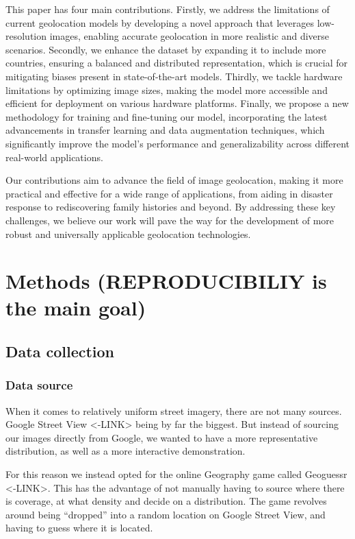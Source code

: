 \documentclass{article}
\begin{document}
This paper has four main contributions. Firstly, we address the
limitations of current geolocation models by developing a novel approach
that leverages low-resolution images, enabling accurate geolocation in
more realistic and diverse scenarios. Secondly, we enhance the dataset
by expanding it to include more countries, ensuring a balanced and
distributed representation, which is crucial for mitigating biases
present in state-of-the-art models. Thirdly, we tackle hardware
limitations by optimizing image sizes, making the model more accessible
and efficient for deployment on various hardware platforms. Finally, we
propose a new methodology for training and fine-tuning our model,
incorporating the latest advancements in transfer learning and data
augmentation techniques, which significantly improve the model's
performance and generalizability across different real-world
applications.

Our contributions aim to advance the field of image geolocation, making
it more practical and effective for a wide range of applications, from
aiding in disaster response to rediscovering family histories and
beyond. By addressing these key challenges, we believe our work will
pave the way for the development of more robust and universally
applicable geolocation technologies.

\section{Methods (REPRODUCIBILIY is the main
goal)}\label{methods-reproducibiliy-is-the-main-goal}

\subsection{Data collection}\label{data-collection}

\subsubsection{Data source}\label{data-source}

When it comes to relatively uniform street imagery, there are not many
sources. Google Street View \textless-LINK\textgreater{} being by far
the biggest. But instead of sourcing our images directly from Google, we
wanted to have a more representative distribution, as well as a more
interactive demonstration.

For this reason we instead opted for the online Geography game called
Geoguessr \textless-LINK\textgreater. This has the advantage of not
manually having to source where there is coverage, at what density and
decide on a distribution. The game revolves around being ``dropped''
into a random location on Google Street View, and having to guess where
it is located.
\end{document}
